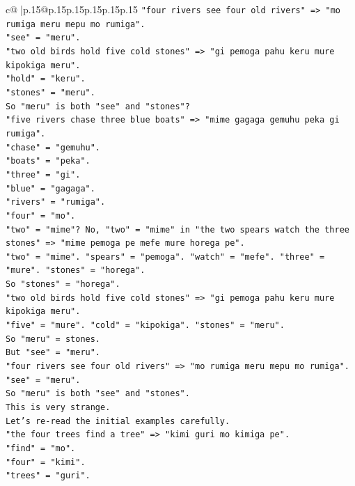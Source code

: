 \documentclass{article}
\begin{document}
{\begin{supertabular}{c@{$\;$}|p{.15\linewidth}@{}p{.15\linewidth}p{.15\linewidth}p{.15\linewidth}p{.15\linewidth}p{.15\linewidth}}
{{{\texttt{"four rivers see four old rivers" => "mo rumiga meru mepu mo rumiga".} \\
\texttt{"see" = "meru".} \\
\texttt{"two old birds hold five cold stones" => "gi pemoga pahu keru mure kipokiga meru".} \\
\texttt{"hold" = "keru".} \\
\texttt{"stones" = "meru".} \\
\texttt{So "meru" is both "see" and "stones"?} \\
\texttt{"five rivers chase three blue boats" => "mime gagaga gemuhu peka gi rumiga".} \\
\texttt{"chase" = "gemuhu".} \\
\texttt{"boats" = "peka".} \\
\texttt{"three" = "gi".} \\
\texttt{"blue" = "gagaga".} \\
\texttt{"rivers" = "rumiga".} \\
\texttt{"four" = "mo".} \\
\texttt{"two" = "mime"? No, "two" = "mime" in "the two spears watch the three stones" => "mime pemoga pe mefe mure horega pe".} \\
\texttt{"two" = "mime". "spears" = "pemoga". "watch" = "mefe". "three" = "mure". "stones" = "horega".} \\
\texttt{So "stones" = "horega".} \\
\texttt{"two old birds hold five cold stones" => "gi pemoga pahu keru mure kipokiga meru".} \\
\texttt{"five" = "mure". "cold" = "kipokiga". "stones" = "meru".} \\
\texttt{So "meru" = stones.} \\
\texttt{But "see" = "meru".} \\
\texttt{"four rivers see four old rivers" => "mo rumiga meru mepu mo rumiga".} \\
\texttt{"see" = "meru".} \\
\texttt{So "meru" is both "see" and "stones".} \\
\texttt{This is very strange.} \\
\texttt{Let's re{-}read the initial examples carefully.} \\
\texttt{"the four trees find a tree" => "kimi guri mo kimiga pe".} \\
\texttt{"find" = "mo".} \\
\texttt{"four" = "kimi".} \\
\texttt{"trees" = "guri".} \\
}}}
\end{supertabular}}
\end{document}
